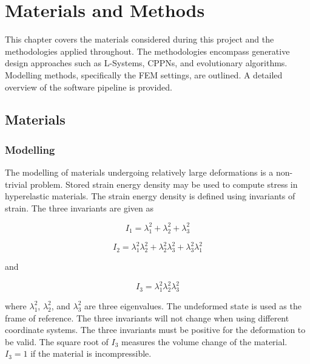 \chapter{Materials and Methods}
\label{chp:MaM}


This chapter covers the materials considered during this project and the methodologies applied throughout. The methodologies encompass generative design approaches such as L-Systems, CPPNs, and evolutionary algorithms. Modelling methods, specifically the FEM settings, are outlined. A detailed overview of the software pipeline is provided.

\section{Materials}

\subsection{Modelling}

The modelling of materials undergoing relatively large deformations is a non-trivial problem. Stored strain energy density may be used to compute stress in hyperelastic materials. The strain energy density is defined using invariants of strain. The three invariants are given as \citep{Kim2015}

\begin{equation}
	I_{1}=\lambda_{1}^{2}+\lambda_{2}^{2}+\lambda_{3}^{2}
\end{equation}

\begin{equation}
	I_{2}=\lambda_{1}^{2}\lambda_{2}^{2}+\lambda_{2}^{2}\lambda_{3}^{2}+\lambda_{3}^{2}\lambda_{1}^{2}
\end{equation}

and

\begin{equation}
	I_{3}=\lambda_{1}^{2}\lambda_{2}^{2}\lambda_{3}^{2}
\end{equation}

where $\lambda_{1}^{2}$, $\lambda_{2}^{2}$, and $\lambda_{3}^{2}$ are three eigenvalues. The undeformed state is used as the frame of reference. The three invariants will not change when using different coordinate systems. The three invariants must be positive for the deformation to be valid. The square root of $I_{3}$ measures the volume change of the material. $I_{3}=1$ if the material is incompressible. \citep{Kim2015}

